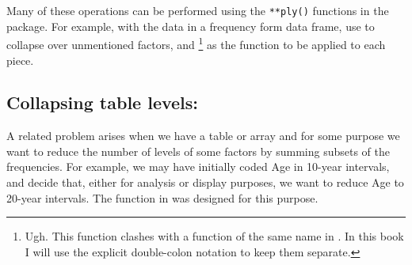 \documentclass[11pt]{book}
\renewenvironment{knitrout}{\small\renewcommand{\baselinestretch}{.85}}{} %
\begin{document}
Many of these operations can be performed using the \verb|**ply()| functions
in the  package.
For example, with the data in a frequency form data frame, use 
to collapse over unmentioned factors, and %
\footnote{
Ugh. This  function clashes with a function of the same name in .
In this book I will use the explicit double-colon notation to keep them
separate.
}
as the function to be applied to each piece.
\begin{knitrout}
\color{fgcolor}\begin{kframe}
\begin{alltt}
 \hlkwb{<-}  
                        \hlstd{=}
\end{alltt}
\end{kframe}
\end{knitrout}

\subsection[Collapsing table levels]{Collapsing table levels: }

A related problem arises when we have a table or array and for some purpose
we want to reduce the number of levels of some factors by summing subsets
of the frequencies.  For example, we may have initially coded Age in 10-year
intervals, and decide that, either for analysis or display purposes, we
want to reduce Age to 20-year intervals.  The  function
in  was designed for this purpose.
\end{document}
